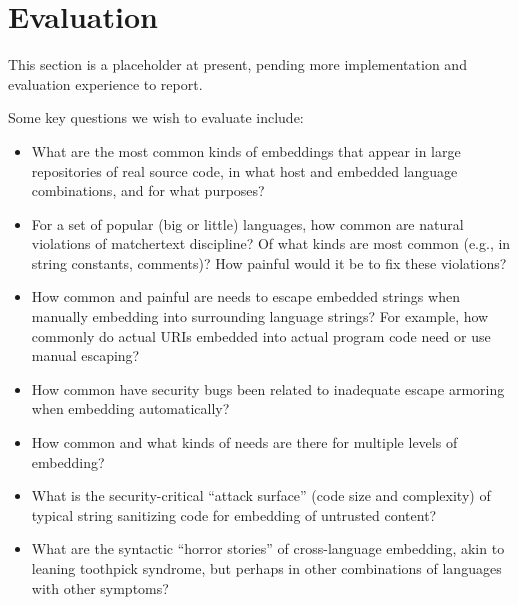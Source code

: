 \section{Evaluation}
\label{sec:eval}

This section is a placeholder at present,
pending more implementation and evaluation experience to report.

Some key questions we wish to evaluate include:
\begin{itemize}
\item	What are the most common kinds of embeddings
	that appear in large repositories of real source code,
	in what host and embedded language combinations,
	and for what purposes?
\item	For a set of popular (big or little) languages,
	how common are natural violations of matchertext discipline?
	Of what kinds are most common (e.g., in string constants, comments)?
	How painful would it be to fix these violations?
\item	How common and painful are needs to escape embedded strings
	when manually embedding into surrounding language strings?
	For example, how commonly do actual URIs embedded into
	actual program code need or use manual escaping?
\item	How common have security bugs been related to
	inadequate escape armoring when embedding automatically?
\item	How common and what kinds of needs are there for
	multiple levels of embedding?
\item	What is the security-critical ``attack surface''
	(\eg code size and complexity)
	of typical string sanitizing code for embedding of untrusted content?
\item	What are the syntactic ``horror stories'' of cross-language embedding,
	akin to leaning toothpick syndrome,
	but perhaps in other combinations of languages with other symptoms?
\end{itemize}


